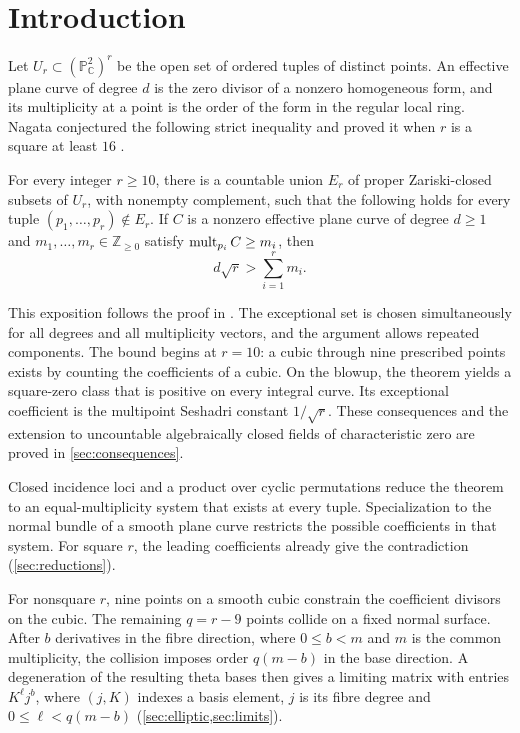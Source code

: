 
\section{Introduction}\label{sec:introduction}

Let $U_r\subset (\mathbb{P}^2_{\mathbb{C}})^r$ be the open set of ordered tuples of distinct points. An effective plane curve of degree $d$ is the zero divisor of a nonzero homogeneous form, and its multiplicity at a point is the order of the form in the regular local ring. Nagata conjectured the following strict inequality and proved it when $r$ is a square at least $16$ \cite{Nagata1959,Nagata1965}.

\begin{maintheorem}\label{thm:main}
For every integer $r\ge10$, there is a countable union $E_r$ of proper Zariski-closed subsets of $U_r$, with nonempty complement, such that the following holds for every tuple $(p_1,\ldots,p_r)\notin E_r$. If $C$ is a nonzero effective plane curve of degree $d\ge1$ and $m_1,\ldots,m_r\in\mathbb{Z}_{\ge0}$ satisfy $\operatorname{mult}_{p_i}C\ge m_i$, then
\[
 d\sqrt r>\sum_{i=1}^r m_i.
\]
\end{maintheorem}

This exposition follows the proof in \cite{OpenAIMathSource}. The exceptional set is chosen simultaneously for all degrees and all multiplicity vectors, and the argument allows repeated components. The bound begins at $r=10$: a cubic through nine prescribed points exists by counting the coefficients of a cubic. On the blowup, the theorem yields a square-zero class that is positive on every integral curve. Its exceptional coefficient is the multipoint Seshadri constant $1/\sqrt r$. These consequences and the extension to uncountable algebraically closed fields of characteristic zero are proved in \cref{sec:consequences}.

Closed incidence loci and a product over cyclic permutations reduce the theorem to an equal-multiplicity system that exists at every tuple. Specialization to the normal bundle of a smooth plane curve restricts the possible coefficients in that system. For square $r$, the leading coefficients already give the contradiction (\cref{sec:reductions}).

For nonsquare $r$, nine points on a smooth cubic constrain the coefficient divisors on the cubic. The remaining $q=r-9$ points collide on a fixed normal surface. After $b$ derivatives in the fibre direction, where $0\leq b<m$ and $m$ is the common multiplicity, the collision imposes order $q(m-b)$ in the base direction. A degeneration of the resulting theta bases then gives a limiting matrix with entries $K^\ell j^b$, where $(j,K)$ indexes a basis element, $j$ is its fibre degree and $0\leq\ell<q(m-b)$ (\cref{sec:elliptic,sec:limits}).

